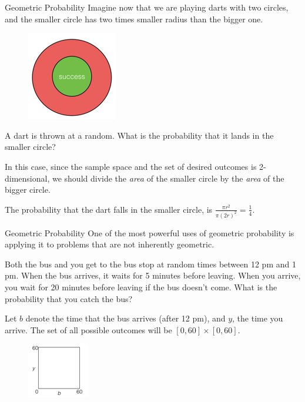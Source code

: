 \documentclass{beamer}
\begin{document}
\begin{frame}{Geometric Probability}
   Imagine now that we are playing darts with two circles, and the smaller circle has two times smaller radius than the bigger one. 
    \begin{figure}
        \centering
        \includegraphics[width=0.3\linewidth]{Dart1.png}
        
        
    \end{figure}
    A dart is thrown at a random. What is the probability that it lands in the smaller circle? \pause

In this case, since the sample space and the set of desired outcomes is 2-dimensional, we should divide the \textit{area} of the smaller circle by the \textit{area} of the bigger circle.

The probability that the dart falls in the smaller circle, is $\frac{\pi r^2}{\pi (2r)^2}=\frac{1}{4}$.
    
    
\end{frame}


\begin{frame}{Geometric Probability}
One of the most powerful uses of geometric probability is applying it to problems that are not inherently geometric.

\pause \begin{example}
    Both the bus and you get to the bus stop at random times between 12 pm and 1 pm. When the bus arrives, it waits for 5 minutes before leaving. When you arrive, you wait for 20 minutes before leaving if the bus doesn't come. What is the probability that you catch the bus?
\end{example}

\pause Let $b$ denote the time that the bus arrives (after 12 pm), and $y$, the time you arrive. The set of all possible outcomes will be $[0,60]\times [0,60]$. \pause
\begin{figure}
    \centering
    \includegraphics[width=0.2\linewidth]{geom1.png}
    \end{figure}
    
    
\end{frame}
\end{document}
